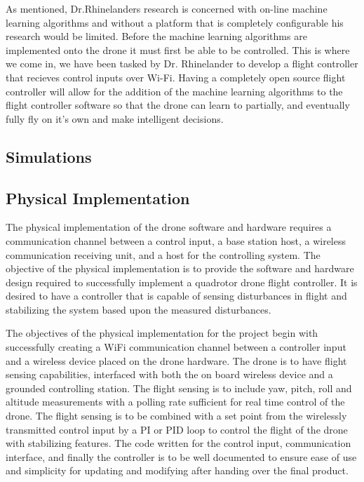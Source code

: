 As mentioned, Dr.Rhinelanders research is concerned with on-line machine learning algorithms and without a platform that is completely configurable his research would be limited. Before the machine learning algorithms are implemented onto the drone it must first be able to be controlled. This is where we come in, we have been tasked by Dr. Rhinelander to develop a flight controller that recieves control inputs over Wi-Fi. Having a completely open source flight controller will allow for the addition of the machine learning algorithms to the flight controller software so that the drone can learn to partially, and eventually fully fly on it's own and make intelligent decisions.

\subsection{Simulations}




\subsection{Physical Implementation}


The physical implementation of the drone software and hardware requires a communication channel between a control input, a base station host, a wireless communication receiving unit, and a host for the controlling system. The objective of the physical implementation is to provide the software and hardware design required to successfully implement a quadrotor drone flight controller. It is desired to have a controller that is capable of sensing disturbances in flight and stabilizing the system based upon the measured disturbances.

The objectives of the physical implementation for the project begin with successfully creating a WiFi communication channel between a controller input and a wireless device placed on the drone hardware. The drone is to have flight sensing capabilities, interfaced with both the on board wireless device and a grounded controlling station. The flight sensing is to include yaw, pitch, roll and altitude measurements with a polling rate sufficient for real time control of the drone. The flight sensing is to be combined with a set point from the wirelessly transmitted control input by a PI or PID loop to control the flight of the drone with stabilizing features. The code written for the control input, communication interface, and finally the controller is to be well documented to ensure ease of use and simplicity for updating and modifying after handing over the final product.



